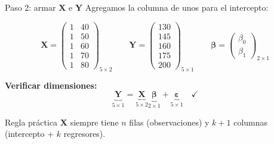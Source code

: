 \documentclass[aspectratio=169, 11pt]{beamer}
\begin{document}

\begin{frame}{Paso 2: armar $\mathbf{X}$ e $\mathbf{Y}$}
Agregamos la columna de unos para el intercepto:

\[
\mathbf{X} = \begin{pmatrix} 1 & 40 \\ 1 & 50 \\ 1 & 60 \\ 1 & 70 \\ 1 & 80 \end{pmatrix}_{5 \times 2}
\qquad
\mathbf{Y} = \begin{pmatrix} 130 \\ 145 \\ 160 \\ 175 \\ 200 \end{pmatrix}_{5 \times 1}
\qquad
\boldsymbol{\beta} = \begin{pmatrix} \beta_0 \\ \beta_1 \end{pmatrix}_{2 \times 1}
\]

\vspace{0.3cm}
\textbf{Verificar dimensiones:}
\[
\underbrace{\mathbf{Y}}_{5\times 1} = \underbrace{\mathbf{X}}_{5\times 2} \underbrace{\boldsymbol{\beta}}_{2\times 1} + \underbrace{\boldsymbol{\varepsilon}}_{5\times 1} \quad \checkmark
\]

\begin{exampleblock}{Regla práctica}
$\mathbf{X}$ siempre tiene $n$ filas (observaciones) y $k+1$ columnas (intercepto + $k$ regresores).
\end{exampleblock}
\end{frame}

\end{document}
